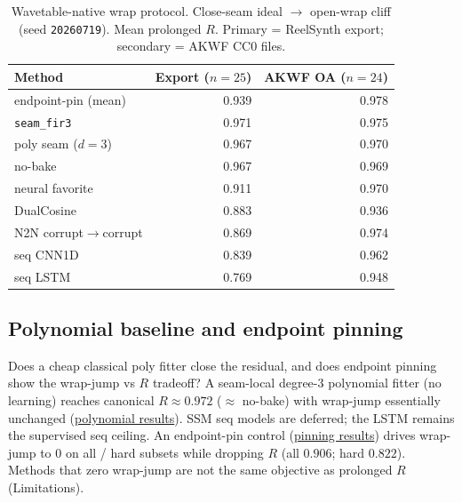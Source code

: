 \begin{table}[t]
  \centering
  \caption{Wavetable-native wrap protocol. Close-seam ideal $\to$ open-wrap cliff (seed \texttt{20260719}). Mean prolonged $R$. Primary = ReelSynth export; secondary = AKWF CC0 files.}
  \label{tab:real-wt}
  \setlength{\tabcolsep}{3pt}
  \begin{tabular}{@{}lrr@{}}
    \toprule
    Method & Export ($n{=}25$) & AKWF OA ($n{=}24$) \\
    \midrule
    endpoint-pin (mean) & 0.939 & 0.978 \\
    \texttt{seam\_fir3} & 0.971 & 0.975 \\
    poly seam ($d{=}3$) & 0.967 & 0.970 \\
    no-bake & 0.967 & 0.969 \\
    neural favorite & 0.911 & 0.970 \\
    DualCosine & 0.883 & 0.936 \\
    N2N corrupt$\to$corrupt & 0.869 & 0.974 \\
    seq CNN1D & 0.839 & 0.962 \\
    seq LSTM & 0.769 & 0.948 \\
    \bottomrule
  \end{tabular}
\end{table}

\subsection{Polynomial baseline and endpoint pinning}
\label{sec:poly-jump}

Does a cheap classical poly fitter close the residual, and does endpoint pinning show the wrap-jump vs $R$ tradeoff?
A seam-local degree-3 polynomial fitter (no learning) reaches canonical $R\approx 0.972$ ($\approx$ no-bake) with wrap-jump essentially unchanged (\href{https://github.com/reeldemo/denoise-opt-meta/blob/master/paper/Unsupervised_Wavetable_Seam_Artifact_Repair_via_Hybrid_GA-PPO_Meta-Search_v10/figures/poly_baseline.json}{polynomial results}).
SSM seq models are deferred; the LSTM remains the supervised seq ceiling.
An endpoint-pin control (\href{https://github.com/reeldemo/denoise-opt-meta/blob/master/paper/Unsupervised_Wavetable_Seam_Artifact_Repair_via_Hybrid_GA-PPO_Meta-Search_v10/figures/jump_control.json}{pinning results}) drives wrap-jump to $0$ on all / hard subsets while dropping $R$ (all $0.906$; hard $0.822$).
Methods that zero wrap-jump are not the same objective as prolonged $R$ (Limitations).

